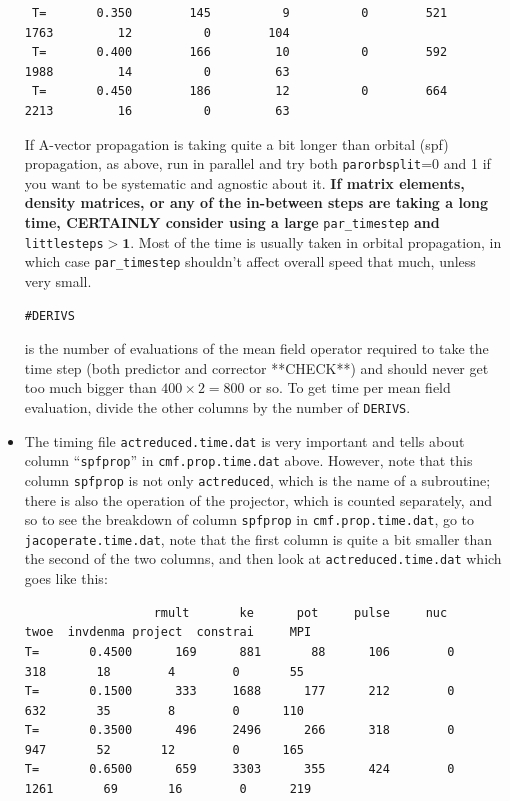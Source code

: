 \documentclass[10pt,leqno, oneside]{book}
\begin{document}
\begin{itemize}
{{\begin{verbatim}
 T=       0.350        145          9          0        521       1763         12          0        104
 T=       0.400        166         10          0        592       1988         14          0         63
 T=       0.450        186         12          0        664       2213         16          0         63
\end{verbatim}}
If A-vector propagation is taking quite a bit longer than orbital (spf) propagation, as above, run in parallel and try both \verb#parorbsplit#=0 and 1
if you want to be systematic and agnostic about it. \textbf{If matrix elements, density
matrices, or any of the in-between steps are taking a long time, CERTAINLY consider using a large} \verb#par_timestep#
\textbf{and} \verb#littlesteps#$\bm{>1}$.
 Most of the time is usually taken
in orbital propagation, in which case \verb#par_timestep# shouldn't affect overall speed that much, unless very small.  \begin{verbatim}#DERIVS\end{verbatim} is the number
of evaluations of the mean field operator required to take the time step (both predictor and corrector **CHECK**) and should never get too much bigger than 
$400 \times 2 = 800$ or so.  To get time per mean field evaluation, divide the other columns by the number of \verb#DERIVS#.}
%
\item{The timing file \verb#actreduced.time.dat# is very important and tells about column ``\verb#spfprop#'' in \verb#cmf.prop.time.dat# above.
However, note that this column \verb#spfprop# is not only \verb#actreduced#, which is the name of a subroutine; 
there is also the operation of the projector, which is counted
separately, and so to see the breakdown of column \verb#spfprop# in \verb#cmf.prop.time.dat#, go to \verb#jacoperate.time.dat#, note that
the first column is quite a bit smaller than the second of the two columns, and then look at \verb#actreduced.time.dat# which goes like this:
{\footnotesize
\begin{verbatim}
                  rmult       ke      pot     pulse     nuc     twoe  invdenma project  constrai     MPI 
T=       0.4500      169      881       88      106        0      318       18        4        0       55
T=       0.1500      333     1688      177      212        0      632       35        8        0      110
T=       0.3500      496     2496      266      318        0      947       52       12        0      165
T=       0.6500      659     3303      355      424        0     1261       69       16        0      219
\end{verbatim}}
}
\end{itemize}
\end{document}
